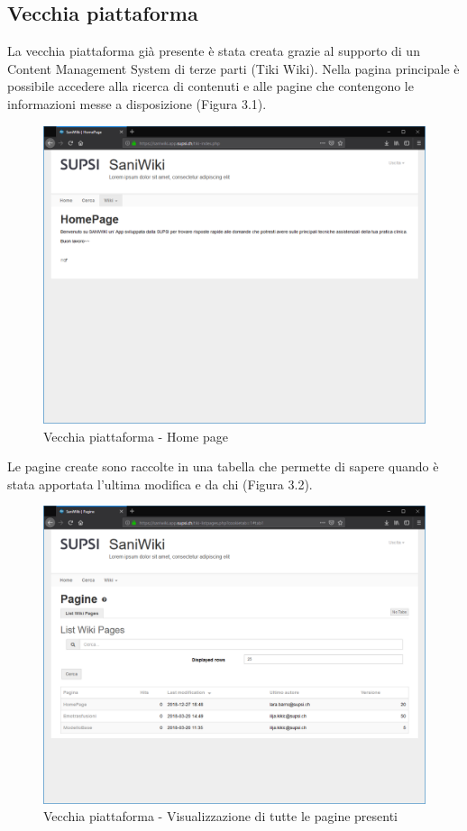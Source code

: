 \documentclass[twoside]{supsistudent}
\begin{document}
\subsection{Vecchia piattaforma}
La vecchia piattaforma già presente è stata creata grazie al supporto di un Content Management System di terze parti (Tiki Wiki). Nella pagina principale è possibile accedere alla ricerca di contenuti e alle pagine che contengono le informazioni messe a disposizione (Figura 3.1).\\
\begin{figure}[!h]
\centering
\includegraphics[scale=0.25]{saniold_home.png}
\caption{Vecchia piattaforma - Home page}
\end{figure}

Le pagine create sono raccolte in una tabella che permette di sapere quando è stata apportata l'ultima modifica e da chi (Figura 3.2).\\
\begin{figure}[!h]
\centering
\includegraphics[scale=0.25]{saniold_list.png}
\caption{Vecchia piattaforma - Visualizzazione di tutte le pagine presenti}
\end{figure}
\end{document}
